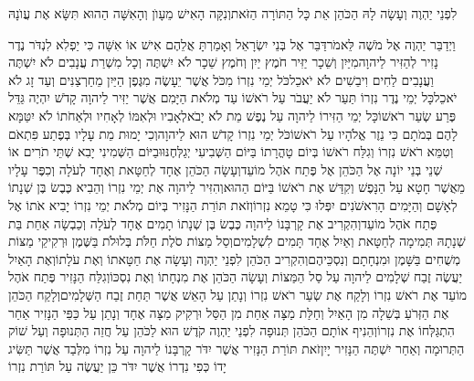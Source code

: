 \documentclass[../main/main.tex]{subfiles}
\begin{document}
\begin{multicols*}{\ncols}
לִפְנֵי יַהְוֶה וְעָשָׂה לָהּ הַכֹּהֵן אֵת כָּל הַתּוֹרָה הַזֹּאת\PreVerseSpace{}וְנִקָּה הָאִישׁ מֵעָוֺן וְהָאִשָּׁה הַהוּא תִּשָּׂא אֶת עֲוֺנָהּ\OpenSection{}\par
{}וַיְדַבֵּר יַהְוֶה אֶל מֹשֶׁה לֵּאמֹר\PreVerseSpace{}דַּבֵּר אֶל בְּנֵי יִשְׂרָאֵל וְאָמַרְתָּ אֲלֵהֶם אִישׁ אוֹ אִשָּׁה כִּי יַפְלִא לִנְדֹּר נֶדֶר נָזִיר לְהַזִּיר לַיהוָה\PreVerseSpace{}מִיַּיִן וְשֵׁכָר יַזִּיר חֹמֶץ יַיִן וְחֹמֶץ שֵׁכָר לֹא יִשְׁתֶּה וְכָל מִשְׁרַת עֲנָבִים לֹא יִשְׁתֶּה וַעֲנָבִים לַחִים וִיבֵשִׁים לֹא יֹאכֵל\PreVerseSpace{}כֹּל יְמֵי נִזְרוֹ מִכֹּל אֲשֶׁר יֵעָשֶׂה מִגֶּפֶן הַיַּיִן מֵחַרְצַנִּים וְעַד זָג לֹא יֹאכֵל\PreVerseSpace{}כָּל יְמֵי נֶדֶר נִזְרוֹ תַּעַר לֹא יַעֲבֹר עַל רֹאשׁוֹ עַד מְלֹאת הַיָּמִם אֲשֶׁר יַזִּיר לַיהוָה קָדֹשׁ יִהְיֶה גַּדֵּל פֶּרַע שְׂעַר רֹאשׁוֹ\PreVerseSpace{}כָּל יְמֵי הַזִּירוֹ לַיהוָה עַל נֶפֶשׁ מֵת לֹא יָבֹא\PreVerseSpace{}לְאָבִיו וּלְאִמּוֹ לְאָחִיו וּלְאַחֹתוֹ לֹא יִטַּמָּא לָהֶם בְּמֹתָם כִּי נֵזֶר אֱלֹהָיו עַל רֹאשׁוֹ\PreVerseSpace{}כֹּל יְמֵי נִזְרוֹ קָדֹשׁ הוּא לַיהוָה\PreVerseSpace{}וְכִי יָמוּת מֵת עָלָיו בְּפֶתַע פִּתְאֹם וְטִמֵּא רֹאשׁ נִזְרוֹ וְגִלַּח רֹאשׁוֹ בְּיוֹם טָהֳרָתוֹ בַּיּוֹם הַשְּׁבִיעִי יְגַלְּחֶנּוּ\PreVerseSpace{}וּבַיּוֹם הַשְּׁמִינִי יָבִא שְׁתֵּי תֹרִים אוֹ שְׁנֵי בְּנֵי יוֹנָה אֶל הַכֹּהֵן אֶל פֶּתַח אֹהֶל מוֹעֵד\PreVerseSpace{}וְעָשָׂה הַכֹּהֵן אֶחָד לְחַטָּאת וְאֶחָד לְעֹלָה וְכִפֶּר עָלָיו מֵאֲשֶׁר חָטָא עַל הַנָּפֶשׁ וְקִדַּשׁ אֶת רֹאשׁוֹ בַּיּוֹם הַהוּא\PreVerseSpace{}וְהִזִּיר לַיהוָה אֶת יְמֵי נִזְרוֹ וְהֵבִיא כֶּבֶשׂ בֶּן שְׁנָתוֹ לְאָשָׁם וְהַיָּמִים הָרִאשֹׁנִים יִפְּלוּ כִּי טָמֵא נִזְרוֹ\PreVerseSpace{}וְזֹאת תּוֹרַת הַנָּזִיר בְּיוֹם מְלֹאת יְמֵי נִזְרוֹ יָבִיא אֹתוֹ אֶל פֶּתַח אֹהֶל מוֹעֵד\PreVerseSpace{}וְהִקְרִיב אֶת קָרְבָּנוֹ לַיהוָה כֶּבֶשׂ בֶּן שְׁנָתוֹ תָמִים אֶחָד לְעֹלָה וְכַבְשָׂה אַחַת בַּת שְׁנָתָהּ תְּמִימָה לְחַטָּאת וְאַיִל אֶחָד תָּמִים לִשְׁלָמִים\PreVerseSpace{}וְסַל מַצּוֹת סֹלֶת חַלֹּת בְּלוּלֹת בַּשֶּׁמֶן וּרְקִיקֵי מַצּוֹת מְשֻׁחִים בַּשָּׁמֶן וּמִנְחָתָם וְנִסְכֵּיהֶם\PreVerseSpace{}וְהִקְרִיב הַכֹּהֵן לִפְנֵי יַהְוֶה וְעָשָׂה אֶת חַטָּאתוֹ וְאֶת עֹלָתוֹ\PreVerseSpace{}וְאֶת הָאַיִל יַעֲשֶׂה זֶבַח שְׁלָמִים לַיהוָה עַל סַל הַמַּצּוֹת וְעָשָׂה הַכֹּהֵן אֶת מִנְחָתוֹ וְאֶת נִסְכּוֹ\PreVerseSpace{}וְגִלַּח הַנָּזִיר פֶּתַח אֹהֶל מוֹעֵד אֶת רֹאשׁ נִזְרוֹ וְלָקַח אֶת שְׂעַר רֹאשׁ נִזְרוֹ וְנָתַן עַל הָאֵשׁ אֲשֶׁר תַּחַת זֶבַח הַשְּׁלָמִים\PreVerseSpace{}וְלָקַח הַכֹּהֵן אֶת הַזְּרֹעַ בְּשֵׁלָה מִן הָאַיִל וְחַלַּת מַצָּה אַחַת מִן הַסַּל וּרְקִיק מַצָּה אֶחָד וְנָתַן עַל כַּפֵּי הַנָּזִיר אַחַר הִתְגַּלְּחוֹ אֶת נִזְרוֹ\PreVerseSpace{}וְהֵנִיף אוֹתָם הַכֹּהֵן תְּנוּפָה לִפְנֵי יַהְוֶה קֹדֶשׁ הוּא לַכֹּהֵן עַל חֲזֵה הַתְּנוּפָה וְעַל שׁוֹק הַתְּרוּמָה וְאַחַר יִשְׁתֶּה הַנָּזִיר יָיִן\PreVerseSpace{}זֹאת תּוֹרַת הַנָּזִיר אֲשֶׁר יִדֹּר קָרְבָּנוֹ לַיהוָה עַל נִזְרוֹ מִלְּבַד אֲשֶׁר תַּשִּׂיג יָדוֹ כְּפִי נִדְרוֹ אֲשֶׁר יִדֹּר כֵּן יַעֲשֶׂה עַל תּוֹרַת נִזְרוֹ\OpenSection{}\par

\end{multicols*}
\end{document}
